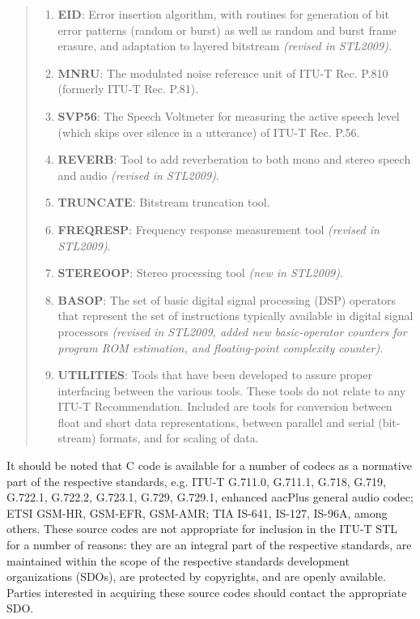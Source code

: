 \begin{quote}
\begin{enumerate}
\item {\bf EID}: Error insertion algorithm, with routines for
  generation of bit error patterns (random or burst) as well as random
  and burst frame erasure, and adaptation to layered bitstream
  \emph{(revised in STL2009)}.

\item {\bf MNRU}: The modulated noise reference unit of ITU-T
  Rec. P.810 (formerly ITU-T Rec. P.81).

\item {\bf SVP56}: The Speech Voltmeter for measuring the active
  speech level (which skips over silence in a utterance) of ITU-T
  Rec. P.56.
        
\item {\bf REVERB}: Tool to add reverberation to both mono and stereo
  speech and audio \emph{(revised in STL2009)}.
        
\item {\bf TRUNCATE}: Bitstream truncation tool.
        
\item {\bf FREQRESP}: Frequency response measurement tool
  \emph{(revised in STL2009)}.
        
\item {\bf STEREOOP}: Stereo processing tool \emph{(new in STL2009)}.
        
\item {\bf BASOP}: The set of basic digital signal processing (DSP)
  operators that represent the set of instructions typically available
  in digital signal processors \emph{(revised in STL2009, added new
  basic-operator counters for program ROM estimation, and
  floating-point complexity counter)}.
        
\item {\bf UTILITIES}: Tools that have been developed to assure proper
  interfacing between the various tools. These tools do not relate to
  any ITU-T Recommendation. Included are tools for conversion between
  float and short data representations, between parallel and serial
  (bit-stream) formats, and for scaling of data.

\end{enumerate}
\end{quote}
It should be noted that C code is available for a number of codecs as
a normative part of the respective standards, e.g. ITU-T G.711.0,
G.711.1, G.718, G.719, G.722.1, G.722.2, G.723.1, G.729, G.729.1,
enhanced aacPlus general audio codec; ETSI GSM-HR, GSM-EFR, GSM-AMR;
TIA IS-641, IS-127, IS-96A, among others. These source codes are not
appropriate for inclusion in the ITU-T STL for a number of reasons:
they are an integral part of the respective standards, are maintained
within the scope of the respective standards development organizations
(SDOs), are protected by copyrights, and are openly available. Parties
interested in acquiring these source codes should contact the
appropriate SDO.

